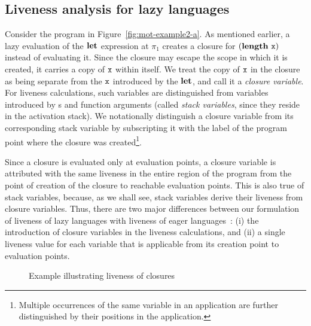 \documentclass[9pt]{sigplanconf}
\begin{document}


\renewcommand{\pp}[2]{\ensuremath{#1\!\!:\!#2}} %


\subsection{Liveness analysis for lazy languages}
\label{sec:liveness-analysis}
  

Consider the  program in Figure~\ref{fig:mot-example2-a}.   As mentioned
earlier, a lazy evaluation of the $\mbox{$\mathbf{ let}$}$ expression at $\pi_1$ creates
a closure  for $(\mathbf{length}~\mbox{\tt x})$  instead of  evaluating it.   Since the
closure may escape the scope in which it is created, it carries a copy
of $\mbox{\tt x}$ within itself.  We treat the  copy of $\mbox{\tt x}$ in the closure as
being separate from the $\mbox{\tt x}$ introduced  by the $\mbox{$\mathbf{ let}$}$, and call it a
\emph{closure  variable}.  For  liveness calculations,  such variables
are distinguished  from variables  introduced by  \LET s  and function
arguments  (called \emph{stack  variables},  since they  reside in  the
activation  stack).   We notationally distinguish  a closure  variable
from  its corresponding  stack variable  by subscripting  it with  the
label of the program   point  where   the   closure  was   created\footnote{Multiple
  occurrences  of the  same  variable in  an  application are  further
  distinguished by their positions in the application.}.


  Since a  closure is evaluated  only at evaluation points,  a closure
  variable is attributed  with the same liveness in  the entire region
  of  the  program from  the  point  of  creation  of the  closure  to
  reachable evaluation points.  This is  also true of stack variables,
  because, as we shall see, stack variables derive their liveness from
  closure variables. Thus, there are two major differences between our
  formulation of  liveness of  lazy languages  with liveness  of eager
  languages~\cite{asati14lgc}:   (i)  the   introduction  of   closure
  variables in the  liveness calculations, and (ii)  a single liveness
  value for each  variable that is applicable from  its creation point
  to evaluation points.

\begin{figure}[t]
    
  \caption{Example illustrating liveness of closures}\label{fig:lv-closure}
\end{figure}

\end{document}
